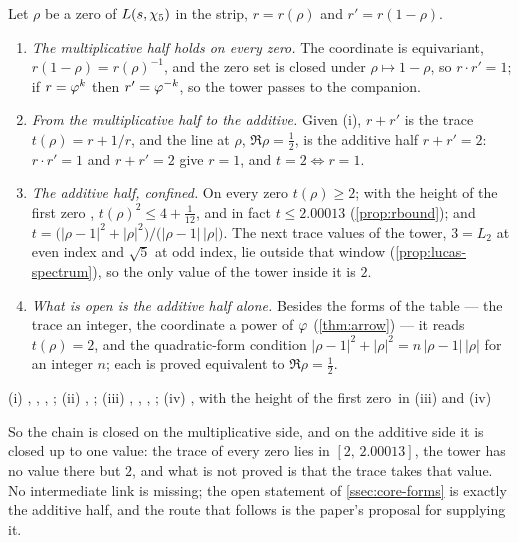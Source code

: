 \begin{proposition}\label{prop:two-halves}
Let $\rho$ be a zero of $L(s,\chi_5)$ in the strip, $r=r(\rho)$ and $r'=r(1-\rho)$.
\begin{enumerate}[label=\textup{(\roman*)}]
  \item \emph{The multiplicative half holds on every zero.}  The coordinate is equivariant,
    $r(1-\rho)=r(\rho)^{-1}$, and the zero set is closed under $\rho\mapsto1-\rho$, so $r\cdot r'=1$;
    if $r=\varphi^k$ then $r'=\varphi^{-k}$, so the tower passes to the companion.
  \item \emph{From the multiplicative half to the additive.}  Given (i), $r+r'$ is the trace
    $t(\rho)=r+1/r$, and the line at $\rho$, $\Re\rho=\tfrac12$, is the additive half $r+r'=2$: $r\cdot r'=1$ and $r+r'=2$ give
    $r=1$, and $t=2\iff r=1$.
  \item \emph{The additive half, confined.}  On every zero $t(\rho)\ge2$; with the height of the first zero
   , $t(\rho)^2\le4+\tfrac1{12}$, and in fact $t\le2.00013$ (\cref{prop:rbound}); and
    $t=\bigl(|\rho-1|^2+|\rho|^2\bigr)/\bigl(|\rho-1|\,|\rho|\bigr)$.  The next trace values of the tower,
    $3=L_2$ at even index and $\sqrt5$ at odd index, lie outside that window
    (\cref{prop:lucas-spectrum}), so the only value of the tower inside it is $2$.
  \item \emph{What is open is the additive half alone.}  Besides the forms of the table --- the trace an integer, the coordinate a power of $\varphi$ (\cref{thm:arrow}) --- it reads $t(\rho)=2$, and the quadratic-form condition $|\rho-1|^2+|\rho|^2=n\,|\rho-1|\,|\rho|$ for an integer $n$; each is proved equivalent to $\Re\rho=\tfrac12$.
\end{enumerate}
(i) , ,
, ;
(ii) , ;
(iii) , ,
, ;
(iv) , with the
height of the first zero\ in (iii) and (iv)
\end{proposition}

So the chain is closed on the multiplicative side, and on the additive side it is closed up to one
value: the trace of every zero lies in $[2,\,2.00013]$, the tower has no value there but $2$, and
what is not proved is that the trace takes that value.  No intermediate link is missing; the open statement of \cref{ssec:core-forms} is exactly the additive half, and the route that follows is the paper's proposal for supplying it.

